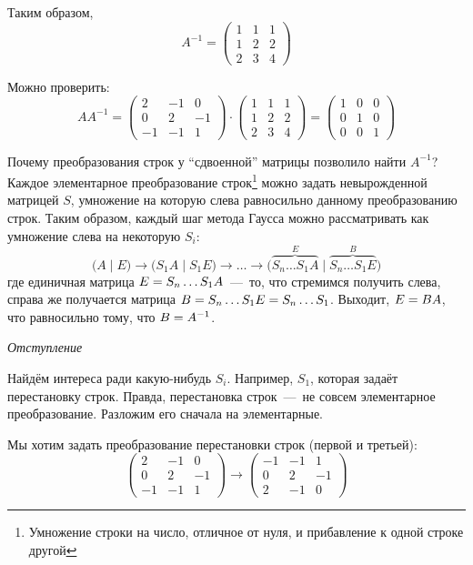 \documentclass[a4paper,12pt]{article}
\begin{document}
\begin{solution}
    Таким образом,
    \[
      A^{-1} = \begin{pmatrix}
        1 & 1 & 1\\
        1 & 2 & 2\\
        2 & 3 & 4
      \end{pmatrix}
    \]
    
    Можно проверить:
    \[
      AA^{-1} = \begin{pmatrix}
        2 & -1 & 0\\
        0 & 2 & -1\\
        -1 & -1 & 1
      \end{pmatrix}
      \cdot \begin{pmatrix}
        1 & 1 & 1\\
        1 & 2 & 2\\
        2 & 3 & 4
      \end{pmatrix}
      = \begin{pmatrix}
        1 & 0 & 0\\
        0 & 1 & 0\\
        0 & 0 & 1
      \end{pmatrix}
    \]
    
    Почему преобразования строк у ``сдвоенной'' матрицы позволило найти $A^{-1}$?
    Каждое элементарное преобразование строк\footnote{Умножение строки на число, отличное от нуля, и прибавление к одной строке другой} можно задать невырожденной матрицей $S$, умножение на которую слева равносильно данному преобразованию строк.
    Таким образом, каждый шаг метода Гаусса можно рассматривать как умножение слева на некоторую $S_i$:
    \[
      \bigl(A \mid E\bigr) \to \bigl(S_1 A \mid S_1 E\bigr) \to \ldots
      \to \bigl(\overbrace{S_n \ldots S_1 A}^{E} \mid \overbrace{S_n \ldots S_1 E}^{B}\bigr)
    \]
    где единичная матрица $E \hm= S_n \ldots S_1 A$~---~то, что стремимся получить слева, справа же получается матрица $B \hm= S_n \ldots S_1 E \hm= S_n \ldots S_1$.
    Выходит, $E \hm= BA$, что равносильно тому, что $B \hm= A^{-1}$.
    
    \bigskip
    
    \emph{Отступление}
    
    Найдём интереса ради какую-нибудь $S_i$.
    Например, $S_1$, которая задаёт перестановку строк.
    Правда, перестановка строк~---~не совсем элементарное преобразование.
    Разложим его сначала на элементарные.
    
    Мы хотим задать преобразование перестановки строк (первой и третьей):
    \[
      \begin{pmatrix}
        2 & -1 & 0\\
        0 & 2 & -1\\
        -1 & -1 & 1
      \end{pmatrix}
      \longrightarrow \begin{pmatrix}
        -1 & -1 & 1\\
        0 & 2 & -1\\
        2 & -1 & 0
      \end{pmatrix}
    \]
    

\end{solution}
\end{document}
